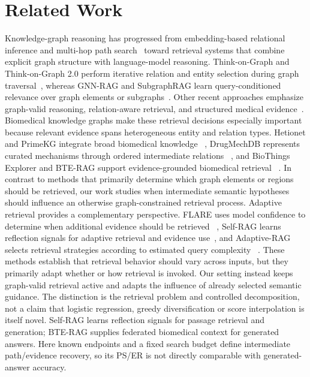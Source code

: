 \documentclass{article} %
\begin{document}



\appendix


\section{Related Work}
\label{app:related_work}

Knowledge-graph reasoning has progressed from embedding-based relational inference
and multi-hop path search~\citep{bordes2013transe,yang2017neurallp,das2018minerva,saxena2020embedkgqa}
toward retrieval systems that combine explicit graph structure with language-model
reasoning. Think-on-Graph and Think-on-Graph 2.0 perform iterative relation and
entity selection during graph traversal~\citep{sun2024tog,ma2025tog2}, whereas
GNN-RAG and SubgraphRAG learn query-conditioned relevance over graph elements
or subgraphs~\citep{mavromatis2025gnnrag,li2025subgraphrag}. Other recent
approaches emphasize graph-valid reasoning, relation-aware retrieval, and
structured medical evidence~\citep{luo2024rog,luo2025gcr,um2026rporag,wu2025medgraphrag}.
Biomedical knowledge graphs make these retrieval decisions especially important
because relevant evidence spans heterogeneous entity and relation types. Hetionet
and PrimeKG integrate broad biomedical knowledge
~\citep{himmelstein2017hetionet,chandak2023primekg}, DrugMechDB represents
curated mechanisms through ordered intermediate relations
~\citep{gonzalez2023drugmechdb}, and BioThings Explorer and BTE-RAG support
evidence-grounded biomedical retrieval
~\citep{callaghan2023biothings,joy2026bterag,matsumoto2024kragen}. In contrast to methods that
primarily determine which graph elements or regions should be retrieved, our work
studies when intermediate semantic hypotheses should influence an otherwise
graph-constrained retrieval process. Adaptive retrieval provides a complementary perspective. FLARE uses model
confidence to determine when additional evidence should be retrieved
~\citep{jiang2023flare}, Self-RAG learns reflection signals for adaptive retrieval
and evidence use~\citep{asai2024selfrag}, and Adaptive-RAG selects retrieval
strategies according to estimated query complexity
~\citep{jeong2024adaptiverag}. These methods establish that retrieval behavior
should vary across inputs, but they primarily adapt whether or how retrieval is
invoked. Our setting instead keeps graph-valid retrieval active and adapts the
influence of already selected semantic guidance. The distinction is the retrieval problem and controlled decomposition, not a claim that logistic regression, greedy diversification or score interpolation is itself novel. Self-RAG learns reflection signals for passage retrieval and generation; BTE-RAG supplies federated biomedical context for generated answers. Here known endpoints and a fixed search budget define intermediate path/evidence recovery, so its PS/ER is not directly comparable with generated-answer accuracy.
\small
\end{document}
